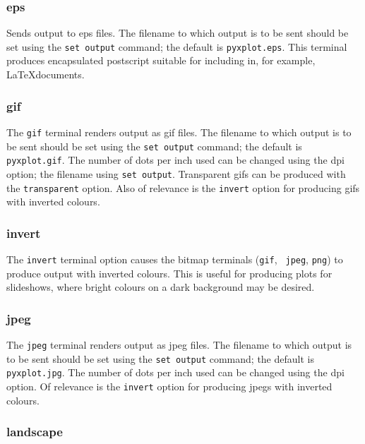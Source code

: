 \subsubsection{eps}

Sends output to eps files.  The filename to which output is to be sent should
be set using the {\tt set output} command; the default is
{\tt pyxplot.eps}.  This terminal produces encapsulated postscript
suitable for including in, for example, \LaTeX documents.


\subsubsection{gif}

The {\tt gif} terminal renders output as gif files. The filename to which output
is to be sent should be set using the {\tt set output} command; the default is
{\tt pyxplot.gif}. The number of dots per inch used can be changed using the dpi
option; the filename using {\tt set output}. Transparent gifs can be produced
with the {\tt transparent} option. Also of relevance is the {\tt invert} option
for producing gifs with inverted colours.


\subsubsection{invert}

The {\tt invert} terminal option causes the bitmap terminals ({\tt gif}, {\tt
jpeg}, {\tt png}) to produce output with inverted colours. This is useful for
producing plots for slideshows, where bright colours on a dark background may be
desired.


\subsubsection{jpeg}

The {\tt jpeg} terminal renders output as jpeg files. The filename to which
output is to be sent should be set using the {\tt set output} command; the
default is {\tt pyxplot.jpg}.  The number of dots per inch used can be changed
using the dpi option. Of relevance is the {\tt invert} option for producing
jpegs with inverted colours.

\subsubsection{landscape}

